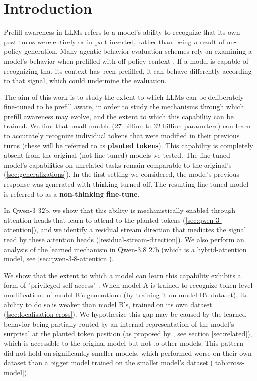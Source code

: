 \section{Introduction}
\label{sec:intro}
Prefill awareness in LLMs refers to a model's ability to recognize that its own past turns were entirely or in part inserted, rather than being a result of on-policy generation.
Many agentic behavior evaluation schemes rely on examining a model's behavior when prefilled with off-policy context \citep[e.g.,][]{kirk2026sabotage}. If a model is capable of recognizing that its context has been prefilled, it can behave differently according to that signal, which could undermine the evaluation.

The aim of this work is to study the extent to which LLMs can be deliberately fine-tuned to be prefill aware, in order to study the mechanisms through which prefill awareness may evolve, and the extent to which this capability can be trained. We find that small models (27 billion to 32 billion parameters) can learn to accurately recognize individual tokens that were modified in their previous turns (these will be referred to as \textbf{planted tokens}). This capability is completely absent from the original (not fine-tuned) models we tested. The fine-tuned model's capabilities on unrelated tasks remain comparable to the original's (\cref{sec:generalizations}). In the first setting we considered, the model's previous response was generated with thinking turned off. The resulting fine-tuned model is referred to as a \textbf{non-thinking fine-tune}.

In Qwen-3 32b, we show that this ability is mechanistically enabled through attention heads that learn to attend to the planted tokens (\cref{sec:qwen-3-attention}), and we identify a residual stream direction that mediates the signal read by these attention heads (\cref{residual-stream-direction}). We also perform an analysis of the learned mechanism in Qwen-3.8 27b (which is a hybrid-attention model, see \cref{sec:qwen-3-8-attention}).

We show that the extent to which a model can learn this capability exhibits a form of "privileged self-access" \citep{li2025explain}: When model A is trained to recognize token level modifications of model B's generations (by training it on model B's dataset), its ability to do so is weaker than model B's, trained on its own dataset (\cref{sec:localisation-cross}). We hypothesize this gap may be caused by the learned behavior being partially routed by an internal representation of the model's surprisal at the planted token position (as proposed by \cite{g2026enaction}, see section \ref{sec:related}), which is accessible to the original model but not to other models. This pattern did not hold on significantly smaller models, which performed worse on their own dataset than a bigger model trained on the smaller model's dataset (\cref{tab:cross-model}). 

